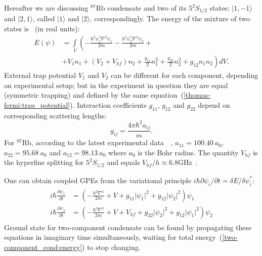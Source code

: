 \documentclass[12pt,notitlepage]{report}
\begin{document}
Hereafter we are discussing $^{87}$Rb condensate and two of its $5^2S_{1/2}$ states: $\vert1,-1\rangle$ and $\vert2,1\rangle$,
called $\vert1\rangle$ and $\vert2\rangle$, correspondingly.
The energy of the mixture of two states is~\cite{pitaevskii_bec} (in real units):
\begin{equation}
\label{two-component_cond:energy}
\begin{split}
E(\psi) & = \int\limits_V \left(
-\frac{\hbar^2 \psi_1^* \nabla^2 \psi_1}{2m} - \frac{\hbar^2 \psi_2^* \nabla^2 \psi_2}{2m} + \right. \\
& \left. + V_1 n_1 + ( V_2 + V_{hf} ) n_2 + \frac{g_{11}}{2} n_1^2 + \frac{g_{22}}{2} n_2^2 + g_{12} n_1 n_2
\right) dV.
\end{split}
\end{equation}
External trap potential $V_1$ and $V_2$ can be different for each component, depending on experimental setup;
but in the experiment in question they are equal (symmetric trapping)
and defined by the same equation~(\ref{thomas-fermi:trap_potential}).
Interaction coefficients $g_{11}$, $g_{12}$ and $g_{22}$ depend on corresponding scattering lengths:
\[ g_{ij} = \frac{4 \pi \hbar^2 a_{ij}}{m}. \]
For $^{87}$Rb, according to the latest experimental data~\cite{servaas_kokkelmans_2010}~\cite{verhaar_van_kempen_kokkelmans_2009},
$a_{11} = 100.40\ a_0$, $a_{22} = 95.68\ a_0$ and $a_{12} = 98.13\ a_0$ where $a_0$ is the Bohr radius.
The quantity $V_{hf}$ is the hyperfine splitting for $5^2S_{1/2}$ and equals $V_{hf} / h \approx 6.8 \textrm{GHz}$~\cite{steck_2009}.

One can obtain coupled GPEs from the variational principle $i \hbar \partial \psi_i / \partial t = \delta E / \delta \psi_i^*$:
\begin{align}
\label{two-component_cond:cgpes}
\begin{split}
i \hbar \frac{\partial \psi_1}{\partial t} & = \left( - \frac{\hbar^2 \nabla^2}{2 m} + V +
g_{11} \lvert \psi_1 \rvert^2 + g_{12} \lvert \psi_2 \rvert^2 \right) \psi_1 \\
i \hbar \frac{\partial \psi_2}{\partial t} & = \left( - \frac{\hbar^2 \nabla^2}{2 m} + V + V_{hf} +
g_{22} \lvert \psi_2 \rvert^2 + g_{12} \lvert \psi_1 \rvert^2 \right) \psi_2
\end{split}
\end{align}
Ground state for two-component condensate can be found by propagating these equations in imaginary time simultaneously,
waiting for total energy~(\ref{two-component_cond:energy}) to stop changing.
\end{document}
